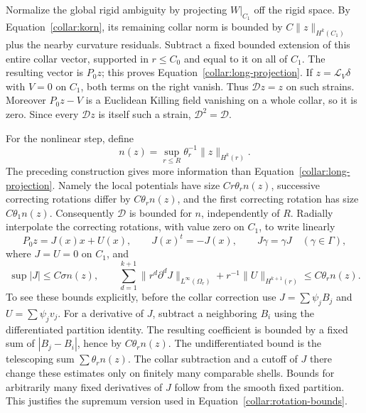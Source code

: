 Normalize the global rigid ambiguity by projecting \(W|_{C_1}\)
off the rigid space.  By Equation~\eqref{collar:korn}, its remaining
collar norm is bounded by \(C\|z\|_{H^k(C_1)}\) plus the nearby
curvature residuals.  Subtract a fixed bounded extension of this
entire collar vector, supported in \(r\le C_0\) and equal to it on
all of \(C_1\).  The resulting vector is \(P_0z\); this proves
Equation~\eqref{collar:long-projection}.  If
\(z=\mathcal L_V\delta\) with \(V=0\) on \(C_1\), both terms on
the right vanish.  Thus \(\mathcal Dz=z\) on such strains.
Moreover \(P_0z-V\) is a Euclidean Killing field vanishing on a
whole collar, so it is zero.  Since every \(\mathcal Dz\) is itself
such a strain, \(\mathcal D^2=\mathcal D\).

For the nonlinear step, define
\[
 n(z)=\sup_{r\le R}\theta_r^{-1}\|z\|_{H^k(r)}.
\]
The preceding construction gives more information than
Equation~\eqref{collar:long-projection}.  Namely the local potentials
have size \(Cr\theta_r n(z)\), successive correcting rotations
differ by \(C\theta_r n(z)\), and the first correcting rotation has
size \(C\theta_1n(z)\).  Consequently \(\mathcal D\) is bounded
for \(n\), independently of \(R\).  Radially interpolate the
correcting rotations, with value zero on \(C_1\), to write linearly
\begin{equation}
 P_0z=J(x)x+U(x),\qquad J(x)^t=-J(x),\qquad
 J\gamma=\gamma J\quad(\gamma\in\Gamma),
 \label{collar:rotation-decomposition}
\end{equation}
where \(J=U=0\) on \(C_1\), and
\begin{equation}
 \sup|J|\le C\sigma n(z),\qquad
 \sum_{d=1}^{k+1}\|r^d\partial^dJ\|_{L^\infty(\Omega_r)}
       +r^{-1}\|U\|_{H^{k+1}(r)}\le C\theta_r n(z).
 \label{collar:rotation-bounds}
\end{equation}
To see these bounds explicitly, before the collar correction use
\(J=\sum\psi_jB_j\) and \(U=\sum\psi_jv_j\).
For a derivative of \(J\), subtract a neighboring \(B_i\) using
the differentiated partition identity.  The resulting coefficient
is bounded by a fixed sum of \(|B_j-B_i|\), hence by
\(C\theta_rn(z)\).  The undifferentiated bound is the telescoping
sum \(\sum\theta_rn(z)\).  The collar subtraction and a cutoff of
\(J\) there change these estimates only on finitely many comparable
shells.  Bounds for arbitrarily many fixed derivatives of \(J\)
follow from the smooth fixed partition.  This justifies the
supremum version used in Equation~\eqref{collar:rotation-bounds}.

